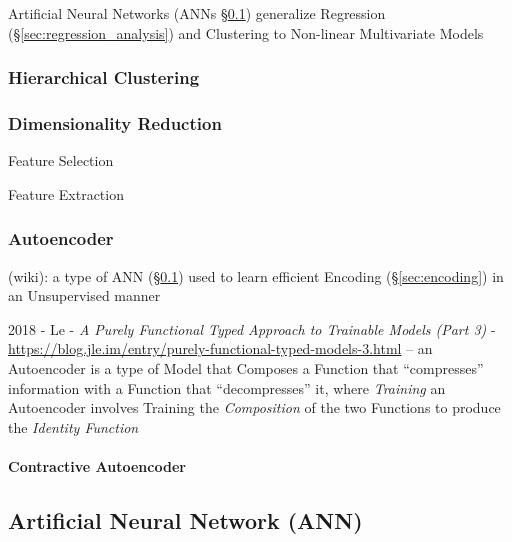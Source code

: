 Artificial Neural Networks (ANNs \S\ref{sec:ann}) generalize Regression
(\S\ref{sec:regression_analysis}) and Clustering to Non-linear Multivariate
Models



\subsubsection{Hierarchical Clustering}\label{sec:hierarchical_clustering}

\subsubsection{Dimensionality Reduction}\label{sec:dimensionality_reduction}

Feature Selection

Feature Extraction



\subsubsection{Autoencoder}\label{sec:autoencoder}

(wiki): a type of ANN (\S\ref{sec:ann}) used to learn efficient Encoding
(\S\ref{sec:encoding}) in an Unsupervised manner

2018 - Le -
\emph{A Purely Functional Typed Approach to Trainable Models (Part 3)} -
\url{https://blog.jle.im/entry/purely-functional-typed-models-3.html}
--
an Autoencoder is a type of Model that Composes a Function that ``compresses''
information with a Function that ``decompresses'' it, where \emph{Training} an
Autoencoder involves Training the \emph{Composition} of the two Functions to
produce the \emph{Identity Function}



\paragraph{Contractive Autoencoder}\label{sec:contractive_autoencoder}\hfill



\subsection{Artificial Neural Network (ANN)}\label{sec:ann}

